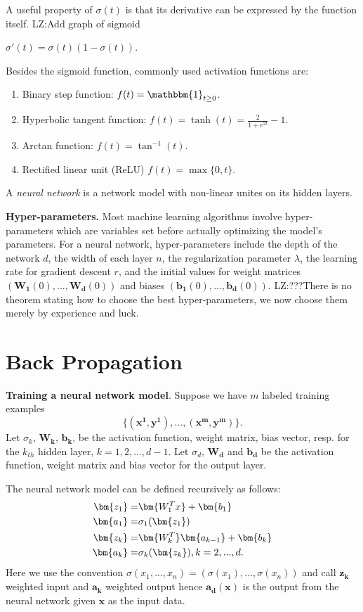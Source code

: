 A useful property of $\sigma(t)$ is that its derivative can be expressed by the function itself.
{\color{red} LZ:Add graph of sigmoid}
\begin{lemma}
\label{lsig}
$\sigma'(t) = \sigma(t)(1-\sigma(t))$.
\end{lemma}


Besides the sigmoid function, commonly used activation functions are:

\begin{enumerate}
\item
Binary step function: $f(t) = \mathbbm{1}_{t\ge 0}$.
\item
Hyperbolic tangent function: $f(t) = \tanh(t)=\frac{2}{1+e^{2t}}-1$.
\item
Arctan function: $f(t) = \tan^{-1}(t)$.
\item
Rectified linear unit (ReLU) $f(t) = \max\{0, t\}$.
\end{enumerate}

A \textit{neural network} is a network model with non-linear unites on its hidden layers.




{\bf Hyper-parameters.} Most machine learning algorithms involve hyper-parameters which are variables set before actually optimizing the model's parameters. For a neural network, hyper-parameters include the depth of the network $d$, the width of each layer $n$, the regularization parameter $\lambda$, the learning rate for gradient descent $r$, and the initial values for weight matrices $(\bm{W_1}(0),...,\bm{W_d}(0))$ and biases $(\bm{b_1}(0),...,\bm{b_d}(0))$. {\color{red} LZ:???}There is no theorem stating how to choose the best hyper-parameters, we now choose them merely by experience and luck.

\section{Back Propagation}

{\bf Training a neural network model}. Suppose we have $m$ labeled training examples
$$\{(\bm{x^1, y^1}),...,(\bm{x^m, y^m})\}.$$ Let $\sigma_k$, $\bm{W_k}$, $\bm{b_k}$, be the activation function, weight matrix, bias vector, resp. for the $k_{th}$ hidden layer, $k=1,2,...,d-1$. Let $\sigma_d$, $\bm{W_d}$ and $\bm{b_d}$ be the activation function, weight matrix and bias vector for the output layer. 

The neural network model can be defined recursively as follows:
\begin{equation}
\label{enn}
\aligned
\bm{z_1}=&\bm{W_1^Tx}+\bm{b_1}\\
\bm{a_1}=&\sigma_1(\bm{z_1})\\
\bm{z_k}=&\bm{W_k^T}\bm{a_{k-1}}+\bm{b_k}\\
\bm{a_k}=&\sigma_k(\bm{z_k}), k=2,...,d.
\endaligned
\end{equation}
Here we use the convention $\sigma(x_1,...,x_n) = (\sigma(x_1),...,\sigma(x_n))$ and call $\bm{z_k}$ weighted input and $\bm{a_k}$ weighted output hence $\bm{a_d}(\bm{x})$ is the output from the neural network given $\bm{x}$ as the input data.

